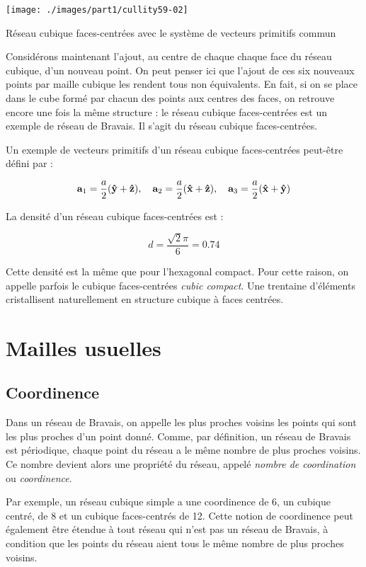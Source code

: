 \begin{marginfigure}
    \texttt{[image: ./images/part1/cullity59-02]}
    \caption{Réseau cubique faces-centrées avec le système de vecteurs primitifs commun}
    \label{fig:fcc}
\end{marginfigure}

Considérons maintenant l'ajout, au centre de chaque chaque face du réseau cubique, d'un nouveau point. On peut penser ici que l'ajout de ces six nouveaux points par maille cubique les rendent tous non équivalents. En fait, si on se place dans le cube formé par chacun des points aux centres des faces, on retrouve encore une fois la même structure : le réseau cubique faces-centrées est un exemple de réseau de Bravais. Il s'agit du réseau cubique faces-centrées.

Un exemple de vecteurs primitifs d'un réseau cubique faces-centrées peut-être défini par :

\begin{equation}
\mathbf{a}_1 = \frac{a}{2}(\mathbf{\hat{y}}+\mathbf{\hat{z}}),
\quad
\mathbf{a}_2 = \frac{a}{2}(\mathbf{\hat{x}}+\mathbf{\hat{z}}),
\quad
\mathbf{a}_3 = \frac{a}{2}(\mathbf{\hat{x}}+\mathbf{\hat{y}})
\end{equation}

La densité d'un réseau cubique faces-centrées est :

\begin{equation}
d = \frac{\sqrt{2}\pi}{6} = 0.74
\end{equation}

Cette densité est la même que pour l'hexagonal compact. Pour cette raison, on appelle parfois le cubique faces-centrées \emph{cubic compact}. Une trentaine d'éléments cristallisent naturellement en structure cubique à faces centrées.

\section{Mailles usuelles}
\subsection{Coordinence}

Dans un réseau de Bravais, on appelle les plus proches voisins les points qui sont les plus proches d'un point donné. Comme, par définition, un réseau de Bravais est périodique, chaque point du réseau a le même nombre de plus proches voisins. Ce nombre devient alors une propriété du réseau, appelé \emph{nombre de coordination} ou \emph{coordinence}.

Par exemple, un réseau cubique simple a une coordinence de 6, un cubique centré, de 8 et un cubique faces-centrés de 12. Cette notion de coordinence peut également être étendue à tout réseau qui n'est pas un réseau de Bravais, à condition que les points du réseau aient tous le même nombre de plus proches voisins.

